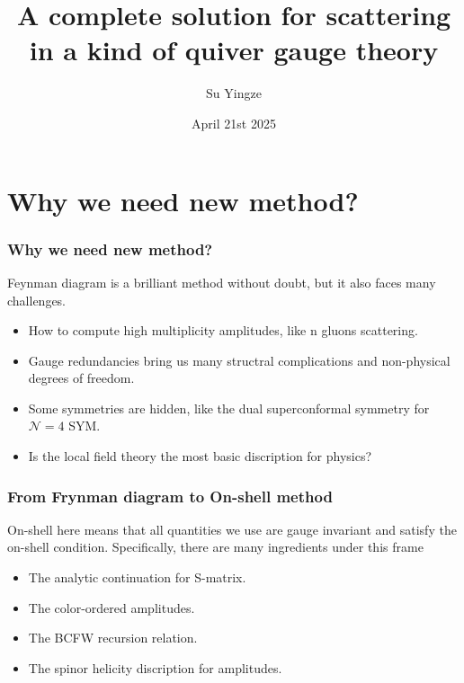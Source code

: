 \documentclass{beamer}
\title[Application of BCFW]{A complete solution for scattering in a kind of quiver gauge theory}
\author{Su Yingze}
\institute{Nagoya University}
\date[4 21st 2025]{April 21st 2025}
\begin{document}
\frame{\titlepage}
\section{Why we need new method?}
\begin{frame}
    \frametitle{Why we need new method?}
    Feynman diagram is a brilliant method without doubt, but it also faces many challenges.
    \begin{itemize}
        \item How to compute high multiplicity amplitudes, like n gluons scattering.
        \item Gauge redundancies bring us many structral complications and non-physical degrees of freedom.
        \item Some symmetries are hidden, like the dual superconformal symmetry for $\mathcal{N}=4$ SYM.
        \item Is the local field theory the most basic discription for physics?
    \end{itemize}
\end{frame}
\begin{frame}
    \frametitle{From Frynman diagram to On-shell method}
    On-shell here means that all quantities we use are gauge invariant and satisfy the on-shell condition.
    Specifically, there are many ingredients under this frame
    \begin{itemize}
        \item The analytic continuation for S-matrix.
        \item The color-ordered amplitudes.
        \item The BCFW recursion relation.
        \item The spinor helicity discription for amplitudes.
    \end{itemize}
\end{frame}
\end{document}
